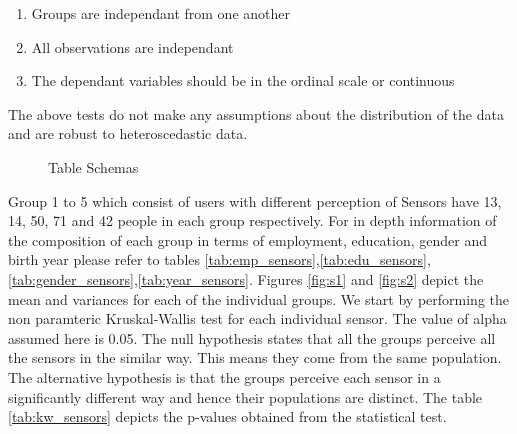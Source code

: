 \begin{enumerate}
\item Groups are independant from one another
\item All observations are independant
\item The dependant variables should be in the ordinal scale or continuous
\end{enumerate}

The above tests do not make any assumptions about the distribution of the data and are robust to heteroscedastic data.
\begin{figure}[htp]
\caption{Table Schemas}
\label{fig:s3}
\end{figure}

Group 1 to 5 which consist of users with different perception of Sensors have 13, 14, 50, 71 and 42 people in each group respectively. For in depth information of the composition of each group in terms of employment, education, gender and birth year please refer to tables
\ref{tab:emp_sensors},\ref{tab:edu_sensors},\ref{tab:gender_sensors},\ref{tab:year_sensors}. Figures \ref{fig:s1} and \ref{fig:s2} depict the mean and variances for each of the individual groups. We start by performing the non paramteric Kruskal-Wallis test for each individual sensor. The value of alpha assumed here is 0.05. The null hypothesis states that all the groups perceive all the sensors in the similar way. This means they come from the same population. The alternative hypothesis is
that the groups perceive each sensor in a significantly different way and hence their populations are distinct. The table \ref{tab:kw_sensors} depicts the p-values obtained from the statistical test.

